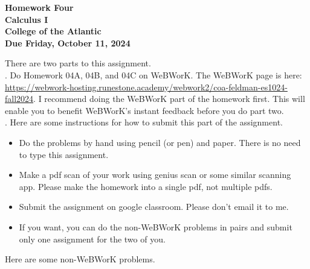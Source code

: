 \documentclass[12pt]{article}
\begin{document}
\pagestyle{empty}
 
\begin{center}
{\LARGE {\bf Homework Four}}\\
\bigskip
{\Large {\bf Calculus I}}\\
\bigskip
{\Large {\bf College of the Atlantic}}\\
\bigskip
{ {\bf Due Friday, October 11, 2024}}\\ 
\end{center}
\medskip


\noindent There are two parts to this assignment.\\

.  Do Homework 04A, 04B, and 04C on
WeBWorK.  The WeBWorK page is here:
\url{https://webwork-hosting.runestone.academy/webwork2/coa-feldman-es1024-fall2024}.
I recommend doing the WeBWorK part of the homework first.  This will
enable you to benefit WeBWorK's instant feedback before you do part
two.\\ 


.  Here are some
instructions for how to submit this part of the assignment.
\begin{itemize}
  \setlength{\itemsep}{0mm}
\item Do the problems by hand using pencil (or pen) and paper.
  There is no need to type this assignment.
\item Make a pdf scan of your work using genius scan or some
  similar scanning app.  Please make the homework into a single
  pdf, not multiple pdfs.
\item Submit the assignment on google classroom.  Please don't
  email it to me.
\item If you want, you can do the non-WeBWorK problems in pairs and
  submit only one assignment for the two of you. \\
\end{itemize}

\noindent Here are some non-WeBWorK problems.
\end{document}
